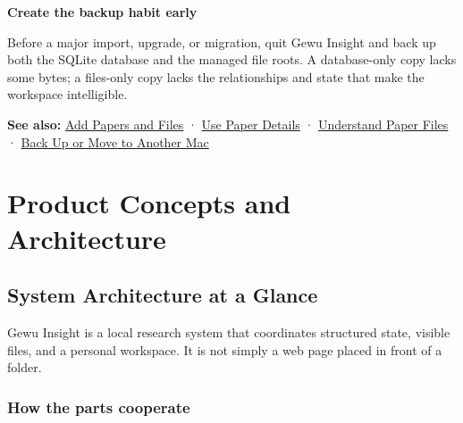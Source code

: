 \documentclass[10pt,letterpaper,oneside]{scrreprt}
\newenvironment{GewuRelated}{\par\nobreak\vspace{3pt}\nobreak\begingroup\small\sffamily\begin{samepage}\noindent}{\par\end{samepage}\endgroup}
\newenvironment{GewuLead}
  {\begin{list}{}{\leftmargin=0pt\rightmargin=0pt\topsep=0pt\partopsep=0pt\parsep=0pt}\item\relax
    \sffamily\fontsize{10.5}{13.2}\selectfont\color{GewuMuted}}
  {\end{list}}
\renewenvironment{quote}
  {\Needspace{5\baselineskip}\begin{tcolorbox}[enhanced,breakable,colback=GewuPale,colframe=GewuPale,boxrule=0pt,
    borderline west={1.6pt}{0pt}{GewuBlue},arc=1.2mm,left=2.5mm,right=2.5mm,top=1.7mm,bottom=1.7mm,
    before skip=4pt,after skip=5pt,fontupper=\color{GewuInk}\small]}
  {\end{tcolorbox}}
\begin{document}
\begin{quote}
\textbf{Create the backup habit early}

Before a major import, upgrade, or migration, quit Gewu Insight and back up both the SQLite database and the managed file roots. A database-only copy lacks some bytes; a files-only copy lacks the relationships and state that make the workspace intelligible.
\end{quote}

\begin{GewuRelated}
\textbf{See also:} \hyperref[import-files]{Add Papers and Files} · \hyperref[paper-details]{Use Paper Details} · \hyperref[paper-files]{Understand Paper Files} · \hyperref[backup-migrate]{Back Up or Move to Another Mac}
\end{GewuRelated}

\part{Product Concepts and Architecture}\label{part-2}

\chapter{System Architecture at a Glance}\label{system-overview}

\begin{GewuLead}
Gewu Insight is a local research system that coordinates structured state, visible files, and a personal workspace. It is not simply a web page placed in front of a folder.
\end{GewuLead}

\section{How the parts cooperate}\label{how-the-parts-cooperate}
\end{document}
